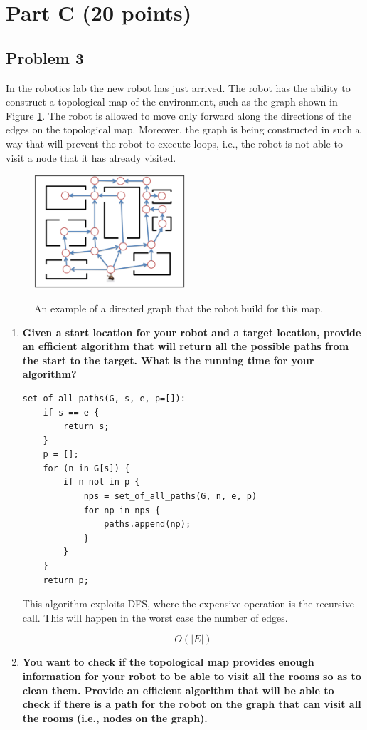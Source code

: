 \documentclass[11pt]{article}
\begin{document}
\section*{Part C (20 points)}

\subsection*{Problem 3} In the robotics lab the new robot has just
arrived. The robot has the ability to construct a topological map of
the environment, such as the graph shown in Figure
\ref{fig:problem3}. The robot is allowed to move only forward along
the directions of the edges on the topological map. Moreover, the
graph is being constructed in such a way that will prevent the robot
to execute loops, i.e., the robot is not able to visit a node that it
has already visited.\\

\begin{figure}[h]
  \centering
  \caption{An example of a directed graph that the robot build for this map.}
    \includegraphics[width=0.5\textwidth]{paths}
    \label{fig:problem3}
\end{figure}

\begin{enumerate}[label=\Alph*.]

\item \textbf{Given a start location for your robot and a target
location, provide an efficient algorithm that will return all the
possible paths from the start to the target.  What is the running time
for your algorithm?}

\begin{verbatim}
set_of_all_paths(G, s, e, p=[]):
    if s == e {
        return s;
    }
    p = [];
    for (n in G[s]) {
        if n not in p {
            nps = set_of_all_paths(G, n, e, p)
            for np in nps {
                paths.append(np);
            }
        }
    }
    return p; 
\end{verbatim}

This algorithm exploits DFS, where the expensive operation is the recursive
call. This will happen in the worst case the number of edges.

$$O(|E|)$$

\item \textbf{You want to check if the topological map provides
enough information for your robot to be able to visit all the rooms so
as to clean them. Provide an efficient algorithm that will be able to
check if there is a path for the robot on the graph that can visit all
the rooms (i.e., nodes on the graph).}
\end{enumerate}
\end{document}
